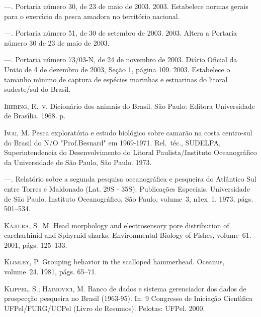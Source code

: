 \documentclass[a4paper,11pt,twoside,showtrims,onecolumn,openright,final]{memoir}
\begin{document}
\begin{thebibliography}{194}
---.
\newblock Portaria n\'umero 30, de 23 de maio de 2003. 2003{}.
\newblock Estabelece normas gerais para o exerc\'{\i}cio da pesca amadora no
  territ\'orio nacional.

---.
\newblock Portaria n\'umero 51, de 30 de setembro de 2003. 2003{}.
\newblock Altera a Portaria n\'umero 30 de 23 de maio de 2003.

---.
\newblock Portaria n\'umero 73/03-{N}, de 24 de novembro de 2003.
\newblock Di\'ario Oficial da Uni\~ao de 4 de dezembro de 2003, Se\c{c}\~ao 1,
  p\'agina 109. 2003{}.
\newblock Estabelece o tamanho m\'{\i}nimo de captura de esp\'ecies marinhas e
  estuarinas do litoral sudeste/sul do Brasil.

\textsc{Ihering, R.~v.}
\newblock Dicion\'ario dos animais do {B}rasil.
\newblock S\~ao Paulo: Editora Universidade de Bras\'{\i}lia. 1968.
 p.

\textsc{Iwai, M.}
\newblock Pesca explorat\'oria e estudo biol\'ogico sobre camar\~ao na costa
  centro-sul do {B}rasil do {N}/{O} "{P}rof.{B}esnard" em 1969-1971.
\newblock Rel.\ t\'ec., SUDELPA, Superintendencia do Desenvolvimento do Litoral
  Paulista/Instituto Oceanogr\'afico da Universidade de S\~ao Paulo, S\~ao
  Paulo. 1973{}.

---.
\newblock Relat\'orio sobre a segunda pesquisa oceanogr\'afica e pesqueira do
  {A}tl\^antico {S}ul entre {T}orres e {M}aldonado ({L}at. 29{S} - 35{S}).
\newblock Publica\c{c}\~oes Especiais. Universidade de S\~ao Paulo. Instituto
  Oceanogr\'afico, S\~ao Paulo, volume~3, n\raise1ex\hbox{}~1. 1973{}, p\'ags. 501--534.

\textsc{Kajiura, S.~M.}
\newblock Head morphology and electrosensory pore distribution of carcharhinid
  and {S}phyrnid sharks.
\newblock Environmental Biology of Fishes, volume~61. 2001, p\'ags. 125--133.

\textsc{Klimley, P.}
\newblock Grouping behavior in the scalloped hammerhead.
\newblock Oceanus, volume~24. 1981, p\'ags. 65--71.

\textsc{Klippel, S.; Haimovici, M.}
\newblock Banco de dados e sistema gerenciador dos dados de prospec\c{c}\~ao
  pesqueira no {B}rasil (1963-95).
\newblock In: 9 {C}ongresso de {I}nicia\c{c}\~ao {C}ient\'{\i}fica
  {UFP}el/{FURG}/{UCP}el ({L}ivro de {R}esumos). Pelotas: UFPel. 2000.


\end{thebibliography}
\end{document}
